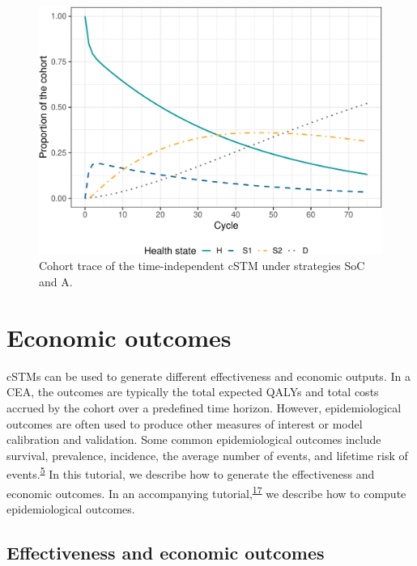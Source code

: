\documentclass[
]{article}
\begin{document}
\begin{figure}[H]

{\centering \includegraphics{figs/Sick-Sicker-Trace-TimeHom-1} 

}

\caption{Cohort trace of the time-independent cSTM under strategies SoC and A.}\label{fig:Sick-Sicker-Trace-TimeHom}
\end{figure}

\hypertarget{economic-outcomes}{%
\section{Economic outcomes}\label{economic-outcomes}}

cSTMs can be used to generate different effectiveness and economic outputs. In a CEA, the outcomes are typically the total expected QALYs and total costs accrued by the cohort over a predefined time horizon. However, epidemiological outcomes are often used to produce other measures of interest or model calibration and validation. Some common epidemiological outcomes include survival, prevalence, incidence, the average number of events, and lifetime risk of events.\textsuperscript{\protect\hyperlink{ref-Siebert2012c}{5}} In this tutorial, we describe how to generate the effectiveness and economic outcomes. In an accompanying tutorial,\textsuperscript{\protect\hyperlink{ref-Alarid-Escudero2021b}{17}} we describe how to compute epidemiological outcomes.

\hypertarget{effectiveness-and-economic-outcomes}{%
\subsection{Effectiveness and economic outcomes}\label{effectiveness-and-economic-outcomes}}
\end{document}
